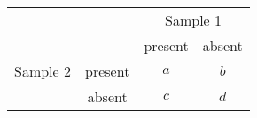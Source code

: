 
\begin{center}
\begin{tabular}{cccc}
 & & \multicolumn{2}{c}{Sample 1} \\
 & & present & absent \\
Sample 2 & present & $a$ & $b$ \\
         & absent  & $c$ & $d$ \\
\end{tabular}
\end{center}

